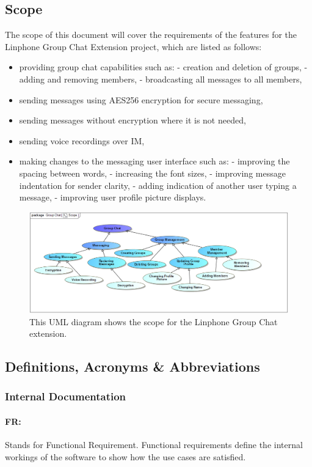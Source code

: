 \documentclass[11pt]{article}
\begin{document}
\subsection{Scope}
The scope of this document will cover the requirements of the features for the Linphone Group Chat Extension project, which are listed as follows:
\begin{itemize}
\item providing group chat capabilities such as:
\subitem  - creation and deletion of groups,
\subitem  - adding and removing members,
\subitem  - broadcasting all messages to all members,
\item sending messages using AES256 encryption for secure messaging,
\item sending messages without encryption where it is not needed,
\item sending voice recordings over IM,
\item making changes to the messaging user interface such as:
\subitem  - improving the spacing between words,
\subitem  - increasing the font sizes,
\subitem  - improving message indentation for sender clarity,
\subitem  - adding indication of another user typing a message,
\subitem  - improving user profile picture displays.
\end{itemize}
\begin{figure}[H]
\centering
\includegraphics[width=5in]{./images/scope_master.png}
\caption[Group Chat Extension Scope]{This UML diagram shows the scope for the Linphone Group Chat extension.}
\label{figure-scope-master}
\end{figure}
\subsection{Definitions, Acronyms \& Abbreviations}
\subsubsection{Internal Documentation}
\paragraph{FR:}
 Stands for Functional Requirement. Functional requirements define the internal workings of the software to show how the use cases are satisfied.
\end{document}
